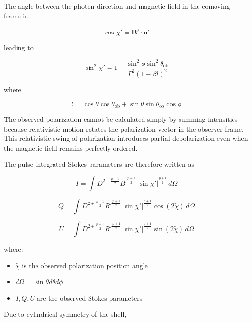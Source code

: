 \documentclass{article}
\begin{document}
The angle between the photon direction and magnetic field in the comoving frame is

\begin{equation}
\cos\chi' = \hat{\mathbf{B}}' \cdot \mathbf{n}'
\end{equation}

leading to

\begin{equation}
\sin^2\chi' =
1 -
\frac{
\sin^2\phi \sin^2\theta_{\mathrm{ob}}
}{
\Gamma^2(1-\beta l)^2
}
\end{equation}

where

\begin{equation}
l =
\cos\theta \cos\theta_{\mathrm{ob}}
+
\sin\theta \sin\theta_{\mathrm{ob}} \cos\phi
\end{equation}

The observed polarization cannot be calculated simply by summing intensities because relativistic motion rotates the polarization vector in the observer frame. This relativistic swing of polarization introduces partial depolarization even when the magnetic field remains perfectly ordered.

The pulse-integrated Stokes parameters are therefore written as

\begin{equation}
I =
\int
D^{2+\frac{p-1}{2}}
B'^{\frac{p+1}{2}}
|\sin\chi'|^{\frac{p+1}{2}}
\, d\Omega
\end{equation}

\begin{equation}
Q =
\int
D^{2+\frac{p-1}{2}}
B'^{\frac{p+1}{2}}
|\sin\chi'|^{\frac{p+1}{2}}
\cos(2\tilde{\chi})
\, d\Omega
\end{equation}

\begin{equation}
U =
\int
D^{2+\frac{p-1}{2}}
B'^{\frac{p+1}{2}}
|\sin\chi'|^{\frac{p+1}{2}}
\sin(2\tilde{\chi})
\, d\Omega
\end{equation}

where:
\begin{itemize}
    \item \(\tilde{\chi}\) is the observed polarization position angle
    \item \(d\Omega = \sin\theta d\theta d\phi\)
    \item \(I,Q,U\) are the observed Stokes parameters
\end{itemize}

Due to cylindrical symmetry of the shell,
\end{document}
